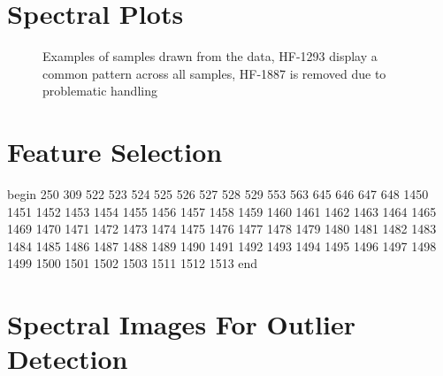 \documentclass[a4paper, 12pt, oneside]{book}
\begin{document}
\begin{appendices}
\chapter{Spectral Plots}

\begin{figure}[h]
\label{appendix:spectraplot}
    \centering
    \qquad
    \caption{Examples of samples drawn from the data, HF-1293 display a common pattern across all samples, HF-1887 is removed due to problematic handling}%
\end{figure}

\chapter{Feature Selection}

\label{appendix:features0}
begin 250  309  522  523  524  525  526  527  528  529  553  563  645  646
  647  648 1450 1451 1452 1453 1454 1455 1456 1457 1458 1459 1460 1461
 1462 1463 1464 1465 1469 1470 1471 1472 1473 1474 1475 1476 1477 1478
 1479 1480 1481 1482 1483 1484 1485 1486 1487 1488 1489 1490 1491 1492
 1493 1494 1495 1496 1497 1498 1499 1500 1501 1502 1503 1511 1512 1513 end


\chapter{Spectral Images For Outlier Detection}


\end{appendices}
\end{document}
